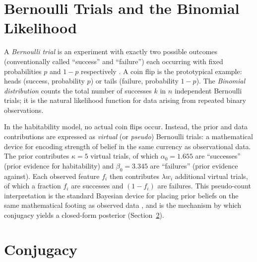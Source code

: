 \section{Bernoulli Trials and the Binomial Likelihood}
\label{sec:bernoulli}

A \textit{Bernoulli trial} is an experiment with exactly two possible outcomes (conventionally called ``success'' and ``failure'') each occurring with fixed probabilities $p$ and $1-p$ respectively \citep[ch.~2]{DeGroot2012}.  A coin flip is the prototypical example: heads (success, probability $p$) or tails (failure, probability $1-p$).  The \textit{Binomial distribution} counts the total number of successes $k$ in $n$ independent Bernoulli trials; it is the natural likelihood function for data arising from repeated binary observations.

In the habitability model, no actual coin flips occur.  Instead, the prior and data contributions are expressed as \textit{virtual} (or \textit{pseudo}) Bernoulli trials: a mathematical device for encoding strength of belief in the same currency as observational data.  The prior contributes $\kappa = 5$ virtual trials, of which $\alpha_0 = 1.655$ are ``successes'' (prior evidence for habitability) and $\beta_0 = 3.345$ are ``failures'' (prior evidence against).  Each observed feature $f_i$ then contributes $\lambda w_i$ additional virtual trials, of which a fraction $f_i$ are successes and $(1-f_i)$ are failures.  This pseudo-count interpretation is the standard Bayesian device for placing prior beliefs on the same mathematical footing as observed data \citep[ch.~2]{Gelman2013}, and is the mechanism by which conjugacy yields a closed-form posterior (Section~\ref{sec:conjugacy_explained}).

\section{Conjugacy}
\label{sec:conjugacy_explained}

